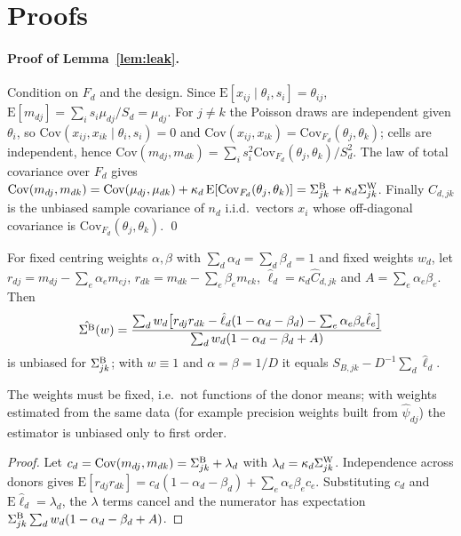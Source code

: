 \section{Proofs}\label{app:proofs}

\paragraph{Proof of Lemma~\ref{lem:leak}.}
Condition on $F_d$ and the design. Since $\mathrm{E}[x_{ij}\mid\theta_i,s_i]=\theta_{ij}$, $\mathrm{E}[m_{dj}]=\sum_is_i\mu_{dj}/S_d=\mu_{dj}$. For $j\neq k$ the Poisson draws are independent given $\theta_i$, so $\mathrm{Cov}(x_{ij},x_{ik}\mid\theta_i,s_i)=0$ and $\mathrm{Cov}(x_{ij},x_{ik})=\mathrm{Cov}_{F_d}(\theta_j,\theta_k)$; cells are independent, hence $\mathrm{Cov}(m_{dj},m_{dk})=\sum_is_i^2\mathrm{Cov}_{F_d}(\theta_j,\theta_k)/S_d^2$. The law of total covariance over $F_d$ gives $\mathrm{Cov}(m_{dj},m_{dk})=\mathrm{Cov}(\mu_{dj},\mu_{dk})+\kappa_d\,\mathrm{E}[\mathrm{Cov}_{F_d}(\theta_j,\theta_k)]=\Sigma^{\mathrm{B}}_{jk}+\kappa_d\Sigma^{\mathrm{W}}_{jk}$. Finally $\hat C_{d,jk}$ is the unbiased sample covariance of $n_d$ i.i.d.\ vectors $x_i$ whose off-diagonal covariance is $\mathrm{Cov}_{F_d}(\theta_j,\theta_k)$. \qed

\begin{proposition}\label{prop:unbiased}
For fixed centring weights $\alpha,\beta$ with $\sum_d\alpha_d=\sum_d\beta_d=1$ and fixed weights $w_d$, let $r_{dj}=m_{dj}-\sum_e\alpha_em_{ej}$, $r_{dk}=m_{dk}-\sum_e\beta_em_{ek}$, $\hat\ell_d=\kappa_d\hat C_{d,jk}$ and $A=\sum_e\alpha_e\beta_e$. Then
\[\hat{\Sigma^{\mathrm{B}}}(w)=\frac{\sum_dw_d\big[r_{dj}r_{dk}-\hat\ell_d(1-\alpha_d-\beta_d)-\sum_e\alpha_e\beta_e\hat\ell_e\big]}{\sum_dw_d(1-\alpha_d-\beta_d+A)}\]
is unbiased for $\Sigma^{\mathrm{B}}_{jk}$; with $w\equiv1$ and $\alpha=\beta=1/D$ it equals $S_{B,jk}-D^{-1}\sum_d\hat\ell_d$.
\end{proposition}
The weights must be fixed, i.e.\ not functions of the donor means; with weights estimated from the same data (for example precision weights built from $\hat\psi_{dj}$) the estimator is unbiased only to first order.
\begin{proof}
Let $c_d=\mathrm{Cov}(m_{dj},m_{dk})=\Sigma^{\mathrm{B}}_{jk}+\lambda_d$ with $\lambda_d=\kappa_d\Sigma^{\mathrm{W}}_{jk}$. Independence across donors gives $\mathrm{E}[r_{dj}r_{dk}]=c_d(1-\alpha_d-\beta_d)+\sum_e\alpha_e\beta_ec_e$. Substituting $c_d$ and $\mathrm{E}\hat\ell_d=\lambda_d$, the $\lambda$ terms cancel and the numerator has expectation $\Sigma^{\mathrm{B}}_{jk}\sum_dw_d(1-\alpha_d-\beta_d+A)$.
\end{proof}

